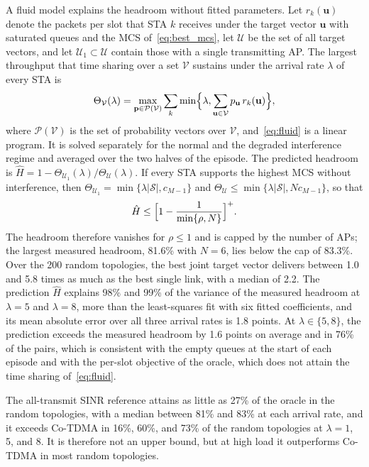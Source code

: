 \documentclass{ieeeaccess}
\begin{document}
A fluid model explains the headroom without fitted parameters. Let $r_k(\mathbf{u})$ denote the packets per slot that STA $k$ receives under the target vector $\mathbf{u}$ with saturated queues and the MCS of~\eqref{eq:best_mcs}, let $\mathcal{U}$ be the set of all target vectors, and let $\mathcal{U}_1 \subset \mathcal{U}$ contain those with a single transmitting AP. The largest throughput that time sharing over a set $\mathcal{V}$ sustains under the arrival rate $\lambda$ of every STA is
\begin{equation}
\Theta_{\mathcal{V}}(\lambda) = \max_{\mathbf{p} \in \mathcal{P}(\mathcal{V})} \sum_{k} \min\Bigl\{\lambda, \sum_{\mathbf{u} \in \mathcal{V}} p_{\mathbf{u}}\, r_k(\mathbf{u})\Bigr\},
\label{eq:fluid}
\end{equation}
where $\mathcal{P}(\mathcal{V})$ is the set of probability vectors over $\mathcal{V}$, and~\eqref{eq:fluid} is a linear program. It is solved separately for the normal and the degraded interference regime and averaged over the two halves of the episode. The predicted headroom is $\hat{H} = 1 - \Theta_{\mathcal{U}_1}(\lambda)/\Theta_{\mathcal{U}}(\lambda)$. If every STA supports the highest MCS without interference, then $\Theta_{\mathcal{U}_1} = \min\{\lambda|\mathcal{S}|, c_{M-1}\}$ and $\Theta_{\mathcal{U}} \le \min\{\lambda|\mathcal{S}|, N c_{M-1}\}$, so that
\begin{equation}
\hat{H} \le \Bigl[1 - \frac{1}{\min\{\rho, N\}}\Bigr]^{+}.
\label{eq:headroom_bound}
\end{equation}
The headroom therefore vanishes for $\rho \le 1$ and is capped by the number of APs; the largest measured headroom, 81.6\% with $N = 6$, lies below the cap of 83.3\%. Over the 200 random topologies, the best joint target vector delivers between 1.0 and 5.8 times as much as the best single link, with a median of 2.2. The prediction $\hat{H}$ explains 98\% and 99\% of the variance of the measured headroom at $\lambda = 5$ and $\lambda = 8$, more than the least-squares fit with six fitted coefficients, and its mean absolute error over all three arrival rates is 1.8 points. At $\lambda \in \{5, 8\}$, the prediction exceeds the measured headroom by 1.6 points on average and in 76\% of the pairs, which is consistent with the empty queues at the start of each episode and with the per-slot objective of the oracle, which does not attain the time sharing of~\eqref{eq:fluid}.

The all-transmit SINR reference attains as little as 27\% of the oracle in the random topologies, with a median between 81\% and 83\% at each arrival rate, and it exceeds Co-TDMA in 16\%, 60\%, and 73\% of the random topologies at $\lambda = 1$, 5, and 8. It is therefore not an upper bound, but at high load it outperforms Co-TDMA in most random topologies.
\end{document}
